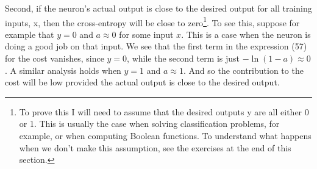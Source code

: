\documentclass[a4paper,twoside,10pt]{book}
\begin{document}
Second, if the neuron's actual output is close to the desired output for all training inputs, x, then the cross-entropy will be close to zero\footnote{To prove this I will need to assume that the desired outputs y are all either 0 or 1. This is usually the case when solving classification problems, for example, or when computing Boolean functions. To understand what happens when we don't make this assumption, see the exercises at the end of this section.}. To see this, suppose for example that $y=0$ and $a\approx0$ for some input $x$. This is a case when the neuron is doing a good job on that input. We see that the first term in the expression (57) for the cost vanishes, since $y=0$, while the second term is just $-\ln(1-a)\approx0$. A similar analysis holds when $y=1$ and $a\approx1$. And so the contribution to the cost will be low provided the actual output is close to the desired output.
\end{document}
